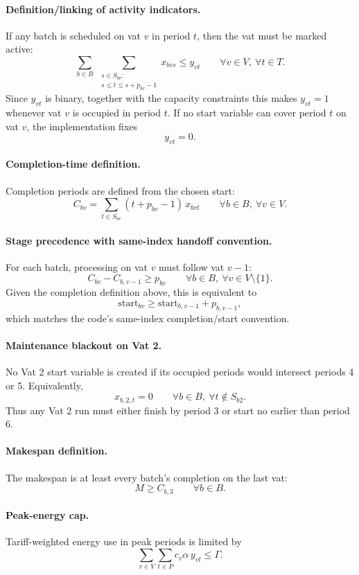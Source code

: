 \paragraph{Definition/linking of activity indicators.}
If any batch is scheduled on vat $v$ in period $t$, then the vat must be marked active:
\[
\sum_{b\in B}\ \sum_{\substack{s\in S_{bv}:\\ s \le t \le s+p_{bv}-1}} x_{bvs} \le y_{vt}
\qquad \forall v\in V,\ \forall t\in T.
\]
Since $y_{vt}$ is binary, together with the capacity constraints this makes $y_{vt}=1$ whenever vat $v$ is occupied in period $t$. If no start variable can cover period $t$ on vat $v$, the implementation fixes
\[
y_{vt}=0.
\]

\paragraph{Completion-time definition.}
Completion periods are defined from the chosen start:
\[
C_{bv}=\sum_{t\in S_{bv}} (t+p_{bv}-1)\,x_{bvt}
\qquad \forall b\in B,\ \forall v\in V.
\]

\paragraph{Stage precedence with same-index handoff convention.}
For each batch, processing on vat $v$ must follow vat $v-1$:
\[
C_{bv}-C_{b,v-1} \ge p_{bv}
\qquad \forall b\in B,\ \forall v\in V\setminus\{1\}.
\]
Given the completion definition above, this is equivalent to
\[
\text{start}_{bv} \ge \text{start}_{b,v-1}+p_{b,v-1},
\]
which matches the code's same-index completion/start convention.

\paragraph{Maintenance blackout on Vat 2.}
No Vat 2 start variable is created if its occupied periods would intersect periods 4 or 5. Equivalently,
\[
x_{b,2,t}=0
\qquad \forall b\in B,\ \forall t \notin S_{b2}.
\]
Thus any Vat 2 run must either finish by period 3 or start no earlier than period 6.

\paragraph{Makespan definition.}
The makespan is at least every batch's completion on the last vat:
\[
M \ge C_{b,3}
\qquad \forall b\in B.
\]

\paragraph{Peak-energy cap.}
Tariff-weighted energy use in peak periods is limited by
\[
\sum_{v\in V}\sum_{t\in P} c_v\alpha\, y_{vt} \le \Gamma.
\]

